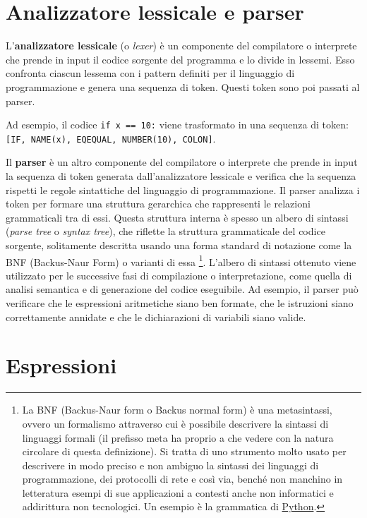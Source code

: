 \documentclass[
  letterpaper,
]{scrbook}
\begin{document}
\section{Analizzatore lessicale e
parser}\label{analizzatore-lessicale-e-parser}

L'\textbf{analizzatore lessicale} (o \emph{lexer}) è un componente del
compilatore o interprete che prende in input il codice sorgente del
programma e lo divide in lessemi. Esso confronta ciascun lessema con i
pattern definiti per il linguaggio di programmazione e genera una
sequenza di token. Questi token sono poi passati al parser.

Ad esempio, il codice \texttt{if\ x\ ==\ 10:} viene trasformato in una
sequenza di token:
\texttt{{[}IF,\ NAME(x),\ EQEQUAL,\ NUMBER(10),\ COLON{]}}.

Il \textbf{parser} è un altro componente del compilatore o interprete
che prende in input la sequenza di token generata dall'analizzatore
lessicale e verifica che la sequenza rispetti le regole sintattiche del
linguaggio di programmazione. Il parser analizza i token per formare una
struttura gerarchica che rappresenti le relazioni grammaticali tra di
essi. Questa struttura interna è spesso un albero di sintassi
(\emph{parse tree} o \emph{syntax tree}), che riflette la struttura
grammaticale del codice sorgente, solitamente descritta usando una forma
standard di notazione come la BNF (Backus-Naur Form) o varianti di essa
\footnote{La BNF (Backus-Naur form o Backus normal form) è una
  metasintassi, ovvero un formalismo attraverso cui è possibile
  descrivere la sintassi di linguaggi formali (il prefisso meta ha
  proprio a che vedere con la natura circolare di questa definizione).
  Si tratta di uno strumento molto usato per descrivere in modo preciso
  e non ambiguo la sintassi dei linguaggi di programmazione, dei
  protocolli di rete e così via, benché non manchino in letteratura
  esempi di sue applicazioni a contesti anche non informatici e
  addirittura non tecnologici. Un esempio è la grammatica di
  \href{https://docs.python.org/3/reference/grammar.html}{Python}.}.
L'albero di sintassi ottenuto viene utilizzato per le successive fasi di
compilazione o interpretazione, come quella di analisi semantica e di
generazione del codice eseguibile. Ad esempio, il parser può verificare
che le espressioni aritmetiche siano ben formate, che le istruzioni
siano correttamente annidate e che le dichiarazioni di variabili siano
valide.

\section{Espressioni}\label{espressioni}
\end{document}
